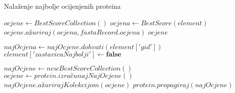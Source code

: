 \begin{algorithm}[h!]
\centering
\caption{Nalaženje najbolje ocijenjenih proteina}
\label{algo:best-score}
\begin{algorithmic}[1]
    \State $ocjene \gets BestScoreCollection()$
            \State $ocjena \gets BestScore(element)$
            \State $ocjene.ažuriraj(ocjena, fastaRecord.ocjena)$
        \EndFor
    \EndFor        
    \State \Return $ocjene$
\EndFunction

            \State $najOcjena \gets najOcjene.dohvati( element['gid'] )$
                \State $element['zastavicaNajbolji'] \gets \textbf{false}$ %
            \EndIf
        \EndFor
    \EndFor
\EndFunction

    \State $najOcjene \gets new BestScoreCollection()$
        \State $ocjene \gets protein.izračunajNajOcjene()$
        \State $najOcjene.ažurirajKolekcijom( ocjene )$
    \EndFor
        \State $protein.propagiraj(najOcjene)$
    \EndFor
\EndFunction
\end{algorithmic}
\end{algorithm}
